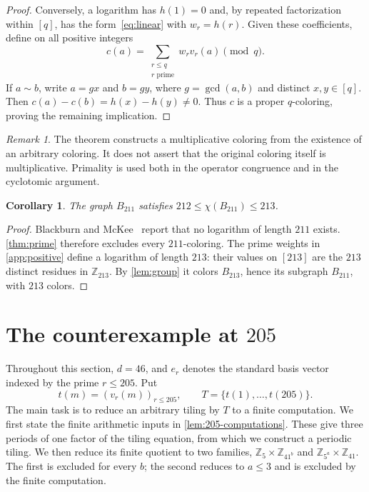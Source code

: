 \documentclass[11pt,reqno]{amsart}
\newcommand{\Z}{\mathbb Z}
\newtheorem{corollary}[theorem]{Corollary}
\theoremstyle{definition}
\theoremstyle{remark}
\newtheorem{remark}[theorem]{Remark}
\numberwithin{equation}{section}
\begin{document}
\begin{proof}
Conversely, a logarithm has $h(1)=0$ and, by repeated factorization
within $[q]$, has the form~\eqref{eq:linear} with $w_r=h(r)$.
Given these coefficients, define on all positive integers
\[
 c(a)=\sum_{\substack{r\le q\\r\text{ prime}}}w_r v_r(a)\pmod q.
\]
If $a\sim b$, write $a=gx$ and $b=gy$, where $g=\gcd(a,b)$ and
distinct $x,y\in[q]$. Then $c(a)-c(b)=h(x)-h(y)\ne0$.
Thus $c$ is a proper $q$-coloring, proving the remaining implication.
\end{proof}

\begin{remark}
The theorem constructs a multiplicative coloring from the existence of an arbitrary coloring. It does not assert that the original coloring itself is multiplicative. Primality is used both in the operator congruence and in the cyclotomic argument.
\end{remark}


\begin{corollary}\label{cor:211}
The graph $B_{211}$ satisfies $212\le\chi(B_{211})\le213$.
\end{corollary}
\begin{proof}
Blackburn and McKee~\cite[\S9.3]{BM} report that no logarithm of length $211$ exists.
\cref{thm:prime} therefore excludes every $211$-coloring.
The prime weights in \cref{app:positive} define a logarithm of length $213$:
their values on $[213]$ are the $213$ distinct residues in $\Z_{213}$.
By \cref{lem:group} it colors $B_{213}$, hence its subgraph $B_{211}$, with $213$ colors.
\end{proof}

\section{The counterexample at \texorpdfstring{$205$}{205}}
\label{sec:205}

Throughout this section, $d=46$, and $e_r$ denotes the standard
basis vector indexed by the prime $r\le205$. Put
\[
 t(m)=(v_r(m))_{r\le205},\qquad T=\{t(1),\ldots,t(205)\}.
\]
The main task is to reduce an arbitrary tiling by $T$ to a finite
computation. We first state the finite arithmetic inputs in
\cref{lem:205-computations}. These give three periods of one factor
of the tiling equation, from which we construct a periodic tiling.
We then reduce its finite quotient to two families,
$\Z_5\times\Z_{41^b}$ and $\Z_{5^a}\times\Z_{41}$.
The first is excluded for every $b$; the second reduces to $a\le3$
and is excluded by the finite computation.
\end{document}
